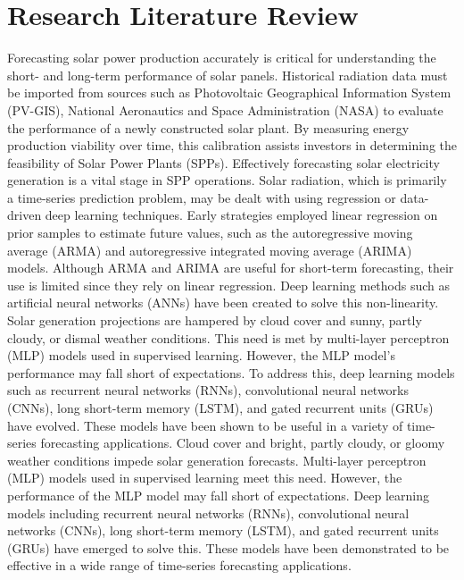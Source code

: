 \documentclass[a4paper,fleqn]{cas-sc}
\begin{document}
\section{Research Literature Review}
Forecasting solar power production accurately is critical for understanding the short- and long-term performance of solar panels. Historical radiation data must be imported from sources such as Photovoltaic Geographical Information System (PV-GIS), National Aeronautics and Space Administration (NASA) to evaluate the performance of a newly constructed solar plant. By measuring energy production viability over time, this calibration assists investors in determining the feasibility of Solar Power Plants (SPPs).
Effectively forecasting solar electricity generation is a vital stage in SPP operations. Solar radiation, which is primarily a time-series prediction problem, may be dealt with using regression or data-driven deep learning techniques. Early strategies employed linear regression on prior samples to estimate future values, such as the autoregressive moving average (ARMA) and autoregressive integrated moving average (ARIMA) models. Although ARMA and ARIMA are useful for short-term forecasting, their use is limited since they rely on linear regression. Deep learning methods such as artificial neural networks (ANNs) have been created to solve this non-linearity.
Solar generation projections are hampered by cloud cover and sunny, partly cloudy, or dismal weather conditions. This need is met by multi-layer perceptron (MLP) models used in supervised learning. However, the MLP model's performance may fall short of expectations. To address this, deep learning models such as recurrent neural networks (RNNs), convolutional neural networks (CNNs), long short-term memory (LSTM), and gated recurrent units (GRUs) have evolved. These models have been shown to be useful in a variety of time-series forecasting applications.
Cloud cover and bright, partly cloudy, or gloomy weather conditions impede solar generation forecasts. Multi-layer perceptron (MLP) models used in supervised learning meet this need. However, the performance of the MLP model may fall short of expectations. Deep learning models including recurrent neural networks (RNNs), convolutional neural networks (CNNs), long short-term memory (LSTM), and gated recurrent units (GRUs) have emerged to solve this. These models have been demonstrated to be effective in a wide range of time-series forecasting applications.
\end{document}

